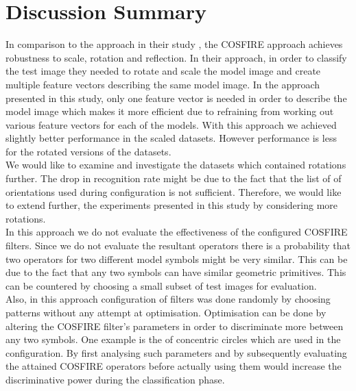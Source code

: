 \section{Discussion Summary}
In comparison to the approach in their study \cite{Delalandre_2012,Nayef}, the COSFIRE approach achieves robustness to scale, rotation and reflection. In their approach, in order to classify the test image they needed to rotate and scale the model image and create multiple feature vectors describing the same model image. In the approach presented in this study, only one feature vector is needed in order to describe the model image which makes it more efficient due to refraining from working out various feature vectors for each of the models. With this approach we achieved slightly better performance in the scaled datasets. However performance is less for the rotated versions of the datasets.\\ 

We would like to examine and investigate the datasets which contained rotations further. The drop in recognition rate might be due to the fact that the list of of orientations used during configuration is not sufficient. Therefore, we would like to extend further, the experiments presented in this study by considering more rotations. \\

In this approach we do not evaluate the effectiveness of the configured COSFIRE filters.  Since we do not evaluate the resultant operators there is a probability that two operators for two different model symbols might be very similar. This can be due to the fact that any two symbols can have similar geometric primitives. This can be countered by choosing a small subset of test images for evaluation.  \\

Also, in this approach configuration of filters was done randomly by choosing patterns without any attempt at optimisation. Optimisation can be done by altering the COSFIRE filter's parameters in order to discriminate more between any two symbols. One example is the of concentric circles which are used in the configuration. By first analysing such parameters and by subsequently evaluating the attained COSFIRE operators before actually using them would increase the discriminative power during the classification phase.\\